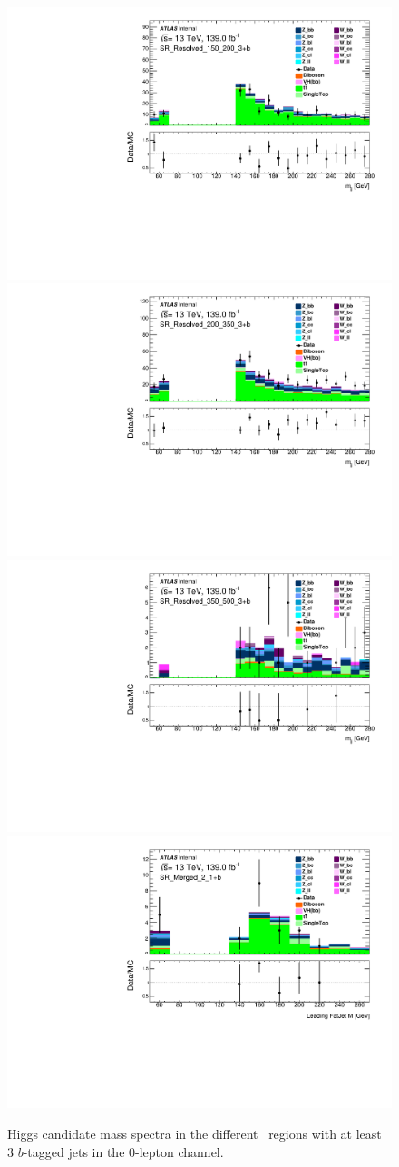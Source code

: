 \begin{figure}[!htb]
    \includegraphics[width=0.46\linewidth]{chapters/c8/figures/0L/DataMC_MonoH_Nominal_SR_Resolved_150_200_3+b_m_jj_10GeV.pdf}
    \includegraphics[width=0.46\linewidth]{chapters/c8/figures/0L/DataMC_MonoH_Nominal_SR_Resolved_200_350_3+b_m_jj_10GeV.pdf}\\
    \includegraphics[width=0.46\linewidth]{chapters/c8/figures/0L/DataMC_MonoH_Nominal_SR_Resolved_350_500_3+b_m_jj_10GeV.pdf}
    \includegraphics[width=0.46\linewidth]{chapters/c8/figures/0L/DataMC_MonoH_Nominal_SR_Merged_2_1+b_fatjets_m1_20GeV.pdf}
    \caption{Higgs candidate mass spectra in the different \met~regions with at least 3 $b$-tagged jets in the 0-lepton channel.}
    \label{fig:data-mc-0l-mjj-3+b}
\end{figure}

